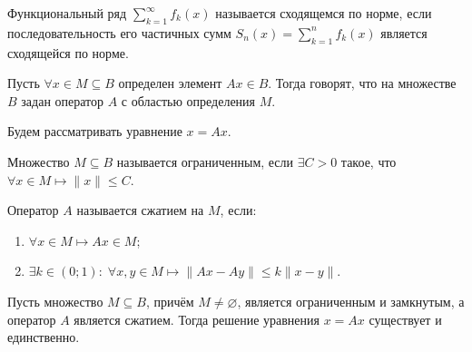 \begin{definition}
	Функциональный ряд $\sum\limits_{k = 1}^{\infty} f_k(x)$ называется сходящемся по норме, если последовательность его частичных сумм $S_n(x) = \sum\limits_{k = 1}^{n} f_k(x)$ является сходящейся по норме.
\end{definition}

\begin{definition}
	Пусть $\forall x \in M \subseteq B$ определен элемент $Ax \in B$. Тогда говорят, что на множестве $B$ задан оператор $A$ с областью определения $M$.
\end{definition}

Будем рассматривать уравнение $x = Ax$.

\begin{definition}
	Множество $M \subseteq B$ называется ограниченным, если $\exists C > 0$ такое, что $\forall x \in M \longmapsto \|x\| \leqslant C$.
\end{definition}

\begin{definition}
	Оператор $A$ называется сжатием на $M$, если:
	\begin{enumerate}
		\item $\forall x \in M \longmapsto Ax \in M$;
		
		\item $\exists k \in (0; 1): \; \forall x, y \in M \longmapsto \|Ax - Ay\| \leqslant k\|x -y\|$.
	\end{enumerate}
\end{definition}

\begin{theorem}
	
	Пусть множество $M \subseteq B$, причём $M \neq \varnothing$, является ограниченным и замкнутым, а оператор $A$ является сжатием. Тогда решение уравнения $x = Ax$ существует и единственно.
\end{theorem}

